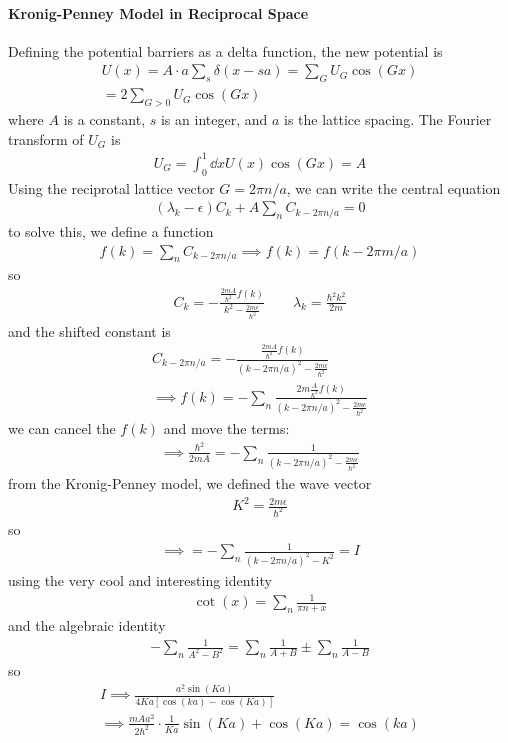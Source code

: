 \documentclass[../main.tex]{subfiles}
\begin{document}
\paragraph*{Kronig-Penney Model in Reciprocal Space} Defining the potential barriers as a delta 
function, the new potential is
\begin{align*}
    U(x) = A \cdot a \sum_s \delta(x - sa) = \sum_G U_G \cos(Gx) \\
    = 2 \sum_{G>0} U_G \cos(Gx)
\end{align*}
where $A$ is a constant, $s$ is an integer, and $a$ is the lattice spacing. The Fourier transform
of $U_G$ is
\begin{align*}
    U_G = \int_0^1 \dd x U(x) \cos(Gx) = A
\end{align*}
Using the reciprotal lattice vector $G = 2\pi n/a$, we can write the central equation
\begin{align*}
    (\lambda_k - \epsilon) C_k + A \sum_n C_{k - 2\pi n/a} = 0
\end{align*}
to solve this, we define a function
\begin{align*}
    f(k) = \sum_n C_{k - 2\pi n/a} \implies f(k) = f(k - 2\pi m/a)
\end{align*}
so
\begin{align*}
    C_k = -\frac{\frac{2mA}{\hbar^2} f(k)}{k^2 - \frac{2m\epsilon}{\hbar^2}}
        \qquad \lambda_k = \frac{\hbar^2 k^2}{2m}
\end{align*}
and the shifted constant is
\begin{align*}
    C_{k-2\pi n/a} = -\frac{\frac{2mA}{\hbar^2} f(k)}{(k-2\pi n/a)^2 - \frac{2m\epsilon}{\hbar^2}} \\
    \implies f(k) = -\sum_n \frac{2m\frac{A}{\hbar^2} f(k)}{(k-2\pi n/a)^2 - \frac{2m\epsilon}{\hbar^2}}
\end{align*}
we can cancel the $f(k)$ and move the terms:
\begin{align*}
    \implies \frac{\hbar^2}{2mA} = -\sum_n \frac{1}{(k-2\pi n/a)^2 - \frac{2m\epsilon}{\hbar^2}}
\end{align*}
from the Kronig-Penney model, we defined the wave vector
\begin{align*}
    K^2 = \frac{2m\epsilon}{\hbar^2}
\end{align*}
so 
\begin{align*}
    \implies = - \sum_n \frac{1}{(k-2\pi n/a)^2 - K^2} = I
\end{align*}
using the very cool and interesting identity
\begin{align*}
    \cot(x) = \sum_n \frac{1}{\pi n + x}
\end{align*}
and the algebraic identity
\begin{align*}
    -\sum_n \frac{1}{A^2 - B^2} = \sum_n \frac{1}{A + B} \pm \sum_n \frac{1}{A - B}
\end{align*}
so
\begin{align*}
    I \implies \frac{a^2\sin(Ka)}{4Ka[\cos(ka) - \cos(Ka)]} \\
    \implies \frac{mAa^2}{2\hbar^2} \cdot \frac{1}{Ka} \sin(Ka) + \cos(Ka) = \cos(ka)
\end{align*}
 
\end{document}
